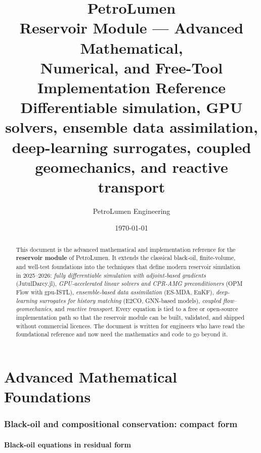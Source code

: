 \documentclass[10pt,a4paper]{article}
\title{
  \vspace{-1.2cm}
  \textbf{PetroLumen}\\[0.2em]
  \large Reservoir Module --- Advanced Mathematical,\\
  Numerical, and Free-Tool Implementation Reference\\[0.4em]
  \normalsize Differentiable simulation, GPU solvers, ensemble data assimilation,\\
  deep-learning surrogates, coupled geomechanics, and reactive transport
}
\author{PetroLumen Engineering}
\date{\today}
\begin{document}
\maketitle
\thispagestyle{empty}

\begin{abstract}
\noindent
This document is the advanced mathematical and implementation reference for
the \textbf{reservoir module} of PetroLumen. It extends the classical
black-oil, finite-volume, and well-test foundations into the techniques that
define modern reservoir simulation in 2025--2026: \emph{fully differentiable
simulation with adjoint-based gradients} (JutulDarcy.jl), \emph{GPU-accelerated
linear solvers and CPR-AMG preconditioners} (OPM Flow with gpu-ISTL),
\emph{ensemble-based data assimilation} (ES-MDA, EnKF), \emph{deep-learning
surrogates for history matching} (E2CO, GNN-based models), \emph{coupled
flow--geomechanics}, and \emph{reactive transport}. Every equation is tied to a
free or open-source implementation path so that the reservoir module can be
built, validated, and shipped without commercial licences. The document is
written for engineers who have read the foundational reference and now need
the mathematics and code to go beyond it.
\end{abstract}

\tableofcontents
\clearpage

\part{Advanced Mathematical Foundations}

\section{Black-oil and compositional conservation: compact form}

\subsection{Black-oil equations in residual form}
\end{document}
